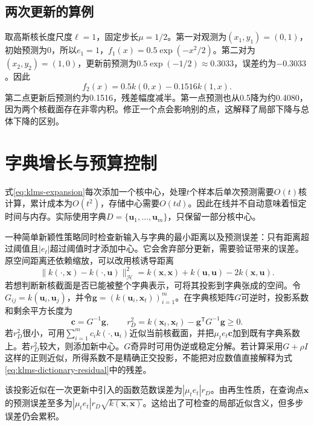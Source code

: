 \subsection{两次更新的算例}
取高斯核长度尺度$\ell=1$，固定步长$\mu=1/2$。第一对观测为$(x_1,y_1)=(0,1)$，初始预测为0，所以$e_1=1$，$f_1(x)=0.5\exp(-x^2/2)$。第二对为$(x_2,y_2)=(1,0)$，更新前预测为$0.5\exp(-1/2)\approx0.3033$，误差约为$-0.3033$。因此
\begin{equation}
 f_2(x)=0.5k(0,x)-0.1516k(1,x).
\end{equation}
第二点更新后预测约为0.1516，残差幅度减半。第一点预测也从0.5降为约0.4080，因为两个核截面存在非零内积。修正一个点会影响别的点，这解释了局部下降与总体下降的区别。

\section{字典增长与预算控制}
式\eqref{eq:klms-expansion}每次添加一个核中心，处理$t$个样本后单次预测需要$O(t)$核计算，累计成本为$O(t^2)$，存储中心需要$O(td)$。因此在线并不自动意味着恒定时间与内存。实际使用字典$D=\{\bm u_1,\ldots,\bm u_m\}$，只保留一部分核中心。

一种简单新颖性策略同时检查新输入与字典的最小距离以及预测误差：只有距离超过阈值且$|e_t|$超过阈值时才添加中心。它会舍弃部分更新，需要验证带来的误差。原空间距离还依赖缩放，可以改用核诱导距离
\begin{equation}
 \|k(\cdot,\bm x)-k(\cdot,\bm u)\|_{\mathcal H}^2
 =k(\bm x,\bm x)+k(\bm u,\bm u)-2k(\bm x,\bm u).
\end{equation}
若想判断新核截面是否已能被整个字典表示，可将其投影到字典张成的空间。令$G_{ij}=k(\bm u_i,\bm u_j)$，并令$\bm g=(k(\bm u_i,\bm x_t))_{i=1}^m$。在字典核矩阵$G$可逆时，投影系数和剩余平方长度为
\begin{equation}
 \bm c=G^{-1}\bm g,\qquad
 r_D^2=k(\bm x_t,\bm x_t)-\bm g^{\mathsf T}G^{-1}\bm g\ge0.
 \label{eq:klms-dictionary-residual}
\end{equation}
若$r_D^2$很小，可用$\sum_{i=1}^m c_i k(\cdot,\bm u_i)$近似当前核截面，并把$\mu_t e_t\bm c$加到既有字典系数上。若$r_D^2$较大，则添加新中心。$G$奇异时可用伪逆或稳定分解。若计算采用$G+\rho I$这样的正则近似，所得系数不是精确正交投影，不能把对应数值直接解释为式\eqref{eq:klms-dictionary-residual}中的残差。

该投影近似在一次更新中引入的函数范数误差为$|\mu_te_t|r_D$。由再生性质，在查询点$\bm x$的预测误差至多为$|\mu_te_t|r_D\sqrt{k(\bm x,\bm x)}$。这给出了可检查的局部近似含义，但多步误差仍会累积。

